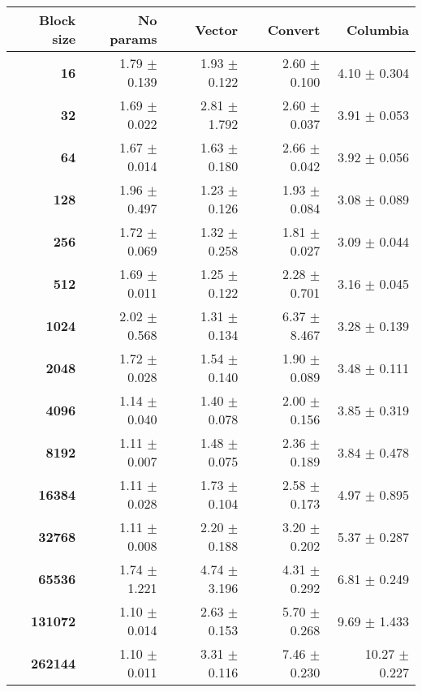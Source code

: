 \begin{tabular}{rrrrr}\toprule
\textbf{Block size}  & \textbf{No params} & \textbf{Vector} & \textbf{Convert} & \textbf{Columbia}\\\midrule
\textbf{16}  & 1.79 $\pm$ 0.139 & 1.93 $\pm$ 0.122 & 2.60 $\pm$ 0.100 & 4.10 $\pm$ 0.304\\
\textbf{32}  & 1.69 $\pm$ 0.022 & 2.81 $\pm$ 1.792 & 2.60 $\pm$ 0.037 & 3.91 $\pm$ 0.053\\
\textbf{64}  & 1.67 $\pm$ 0.014 & 1.63 $\pm$ 0.180 & 2.66 $\pm$ 0.042 & 3.92 $\pm$ 0.056\\
\textbf{128}  & 1.96 $\pm$ 0.497 & 1.23 $\pm$ 0.126 & 1.93 $\pm$ 0.084 & 3.08 $\pm$ 0.089\\
\textbf{256}  & 1.72 $\pm$ 0.069 & 1.32 $\pm$ 0.258 & 1.81 $\pm$ 0.027 & 3.09 $\pm$ 0.044\\
\textbf{512}  & 1.69 $\pm$ 0.011 & 1.25 $\pm$ 0.122 & 2.28 $\pm$ 0.701 & 3.16 $\pm$ 0.045\\
\textbf{1024}  & 2.02 $\pm$ 0.568 & 1.31 $\pm$ 0.134 & 6.37 $\pm$ 8.467 & 3.28 $\pm$ 0.139\\
\textbf{2048}  & 1.72 $\pm$ 0.028 & 1.54 $\pm$ 0.140 & 1.90 $\pm$ 0.089 & 3.48 $\pm$ 0.111\\
\textbf{4096}  & 1.14 $\pm$ 0.040 & 1.40 $\pm$ 0.078 & 2.00 $\pm$ 0.156 & 3.85 $\pm$ 0.319\\
\textbf{8192}  & 1.11 $\pm$ 0.007 & 1.48 $\pm$ 0.075 & 2.36 $\pm$ 0.189 & 3.84 $\pm$ 0.478\\
\textbf{16384}  & 1.11 $\pm$ 0.028 & 1.73 $\pm$ 0.104 & 2.58 $\pm$ 0.173 & 4.97 $\pm$ 0.895\\
\textbf{32768}  & 1.11 $\pm$ 0.008 & 2.20 $\pm$ 0.188 & 3.20 $\pm$ 0.202 & 5.37 $\pm$ 0.287\\
\textbf{65536}  & 1.74 $\pm$ 1.221 & 4.74 $\pm$ 3.196 & 4.31 $\pm$ 0.292 & 6.81 $\pm$ 0.249\\
\textbf{131072}  & 1.10 $\pm$ 0.014 & 2.63 $\pm$ 0.153 & 5.70 $\pm$ 0.268 & 9.69 $\pm$ 1.433\\
\textbf{262144} & 1.10 $\pm$ 0.011 & 3.31 $\pm$ 0.116 & 7.46 $\pm$ 0.230 & 10.27 $\pm$ 0.227\\
\bottomrule
\end{tabular}

